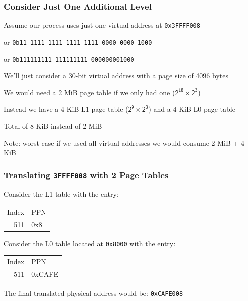   \begin{frame}
    \frametitle{Consider Just One Additional Level}

    Assume our process uses just one virtual address at \texttt{0x3FFFF008}

    \hspace{2em} or \texttt{0b11\_1111\_1111\_1111\_1111\_0000\_0000\_1000}

    \hspace{2em} or \texttt{0b111111111\_111111111\_000000001000}

    \vspace{2em}

    We'll just consider a 30-bit virtual address with a page size of 4096 bytes

    \hspace{2em} We would need a 2 MiB page table if we only had one ($\mathsf{2^{18} \times 2^{3}}$)

    \vspace{2em}

    Instead we have a 4 KiB L1 page table ($\mathsf{2^9 \times 2^{3}}$) and a 4 KiB L0 page table

    \hspace{2em} Total of 8 KiB instead of 2 MiB

    \vspace{2em}

    Note: worst case if we used all virtual addresses we would consume 2 MiB + 4 KiB
  \end{frame}

  \begin{frame}
    \frametitle{Translating \texttt{3FFFF008} with 2 Page Tables}

    Consider the L1 table with the entry:

    \begin{center}
    {\ttfamily
    \begin{tabular}{rl}
      Index & PPN \\
      511   & 0x8 \\
    \end{tabular}}
    \end{center}
      
    Consider the L0 table located at \texttt{0x8000} with the entry:

    \begin{center}
    {\ttfamily
    \begin{tabular}{rl}
      Index & PPN \\
      511   & 0xCAFE \\
    \end{tabular}}
    \end{center}
    
    The final translated physical address would be: \texttt{0xCAFE008}
  \end{frame}

